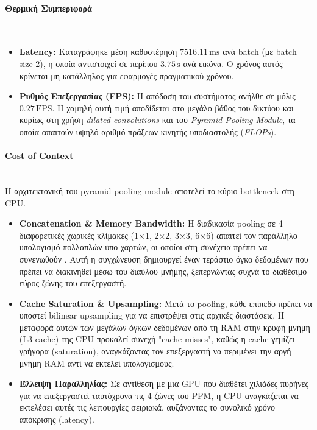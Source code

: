 \documentclass[12pt]{article}
\begin{document}
\paragraph{Θερμική Συμπεριφορά}
\mbox{}\\
\begin{itemize}
    \item \textbf{Latency:} Καταγράφηκε μέση καθυστέρηση \(7516.11\,\text{ms}\) ανά batch (με batch size 2), η οποία αντιστοιχεί σε περίπου \(3.75\,\text{s}\) ανά εικόνα. Ο χρόνος αυτός κρίνεται μη κατάλληλος για εφαρμογές πραγματικού χρόνου.

    \item \textbf{Ρυθμός Επεξεργασίας (FPS):} Η απόδοση του συστήματος ανήλθε σε μόλις \(0.27\,\text{FPS}\). Η χαμηλή αυτή τιμή αποδίδεται στο μεγάλο βάθος του δικτύου και κυρίως στη χρήση \textit{dilated convolutions} και του \textit{Pyramid Pooling Module}, τα οποία απαιτούν υψηλό αριθμό πράξεων κινητής υποδιαστολής (\textit{FLOPs}).
\end{itemize}


\paragraph{Cost of Context}
\mbox{}\\
Η αρχιτεκτονική του pyramid pooling module αποτελεί το κύριο bottleneck στη CPU.
\begin{itemize}
    \item \textbf{Concatenation \& Memory Bandwidth:} 
    Η διαδικασία pooling σε 4 διαφορετικές χωρικές κλίμακες (1×1, 2×2, 3×3, 6×6) απαιτεί τον παράλληλο υπολογισμό πολλαπλών υπο-χαρτών, οι οποίοι στη συνέχεια πρέπει να συνενωθούν . Αυτή η συγχώνευση δημιουργεί έναν τεράστιο όγκο δεδομένων που πρέπει να διακινηθεί μέσω του διαύλου μνήμης, ξεπερνώντας συχνά το διαθέσιμο εύρος ζώνης του επεξεργαστή.

    \item \textbf{Cache Saturation \& Upsampling:} 
    Μετά το pooling, κάθε επίπεδο πρέπει να υποστεί bilinear upsampling για να επιστρέψει στις αρχικές διαστάσεις. Η μεταφορά αυτών των μεγάλων όγκων δεδομένων από τη RAM στην κρυφή μνήμη (L3 cache) της CPU προκαλεί συνεχή "cache misses", καθώς η cache γεμίζει γρήγορα (saturation), αναγκάζοντας τον επεξεργαστή να περιμένει την αργή μνήμη RAM αντί να εκτελεί υπολογισμούς.

    \item \textbf{Έλλειψη Παραλληλίας:} 
    Σε αντίθεση με μια GPU που διαθέτει χιλιάδες πυρήνες για να επεξεργαστεί ταυτόχρονα τις 4 ζώνες του PPM, η CPU αναγκάζεται να εκτελέσει αυτές τις λειτουργίες σειριακά, αυξάνοντας το συνολικό χρόνο απόκρισης (latency).
\end{itemize}
\end{document}
